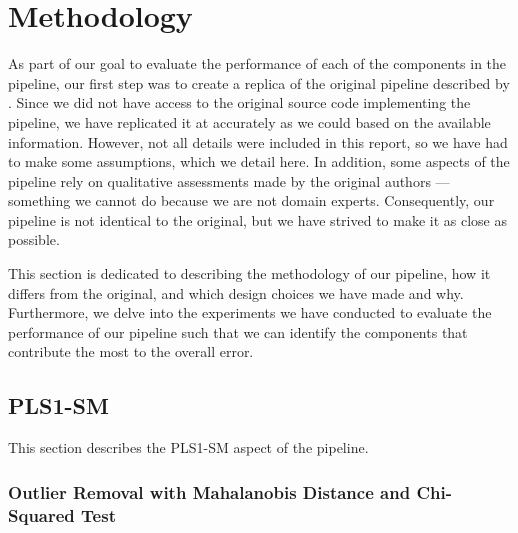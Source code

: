 \section{Methodology}\label{sec:methodology}
As part of our goal to evaluate the performance of each of the components in the pipeline, our first step was to create a replica of the original pipeline described by \citeauthor{cleggRecalibrationMarsScience2017}.
Since we did not have access to the original source code implementing the pipeline, we have replicated it at accurately as we could based on the available information.
However, not all details were included in this report, so we have had to make some assumptions, which we detail here.
In addition, some aspects of the pipeline rely on qualitative assessments made by the original authors --- something we cannot do because we are not domain experts.
Consequently, our pipeline is not identical to the original, but we have strived to make it as close as possible.

This section is dedicated to describing the methodology of our pipeline, how it differs from the original, and which design choices we have made and why.
Furthermore, we delve into the experiments we have conducted to evaluate the performance of our pipeline such that we can identify the components that contribute the most to the overall error.

\subsection{PLS1-SM}
This section describes the PLS1-SM aspect of the pipeline.

\subsubsection{Outlier Removal with Mahalanobis Distance and Chi-Squared Test}

